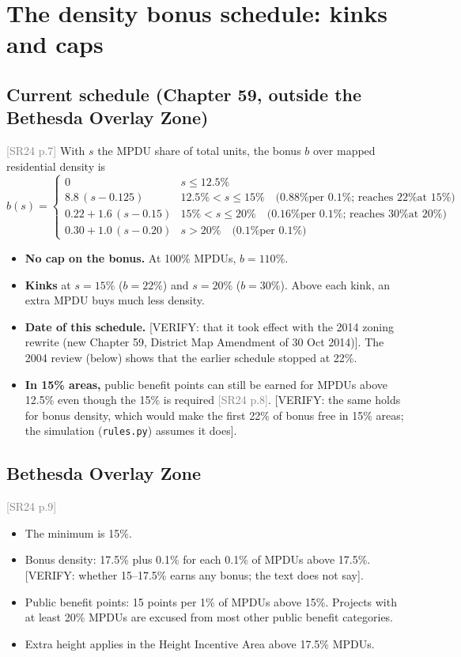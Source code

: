 \documentclass[11pt]{article}
\newcommand{\verify}[1]{\textcolor{red!70!black}{[VERIFY: #1]}}
\newcommand{\src}[1]{\textcolor{gray}{\small[#1]}}
\begin{document}
\section{The density bonus schedule: kinks and caps}
\subsection*{Current schedule (Chapter 59, outside the Bethesda Overlay Zone)}
\src{SR24 p.7} With $s$ the MPDU share of total units, the bonus $b$ over mapped residential density is
\[
b(s)=\begin{cases}
0 & s\le 12.5\%\\
8.8\,(s-0.125) & 12.5\% < s\le 15\% \quad\text{(0.88\% per 0.1\%; reaches 22\% at 15\%)}\\
0.22+1.6\,(s-0.15) & 15\% < s\le 20\% \quad\text{(0.16\% per 0.1\%; reaches 30\% at 20\%)}\\
0.30+1.0\,(s-0.20) & s>20\% \quad\text{(0.1\% per 0.1\%)}
\end{cases}
\]
\begin{itemize}
  \item \textbf{No cap on the bonus.} At 100\% MPDUs, $b=110\%$.
  \item \textbf{Kinks} at $s=15\%$ ($b=22\%$) and $s=20\%$ ($b=30\%$). Above each kink, an extra MPDU buys much less density.
  \item \textbf{Date of this schedule.} \verify{that it took effect with the 2014 zoning rewrite (new Chapter 59, District Map Amendment of 30 Oct 2014)}. The 2004 review (below) shows that the earlier schedule stopped at 22\%.
  \item \textbf{In 15\% areas,} public benefit points can still be earned for MPDUs above 12.5\% even though the 15\% is required \src{SR24 p.8}. \verify{the same holds for bonus density, which would make the first 22\% of bonus free in 15\% areas; the simulation (\texttt{rules.py}) assumes it does}.
\end{itemize}

\subsection*{Bethesda Overlay Zone}
\src{SR24 p.9}
\begin{itemize}
  \item The minimum is 15\%.
  \item Bonus density: 17.5\% plus 0.1\% for each 0.1\% of MPDUs above 17.5\%. \verify{whether 15--17.5\% earns any bonus; the text does not say}.
  \item Public benefit points: 15 points per 1\% of MPDUs above 15\%. Projects with at least 20\% MPDUs are excused from most other public benefit categories.
  \item Extra height applies in the Height Incentive Area above 17.5\% MPDUs.
\end{itemize}
\end{document}
